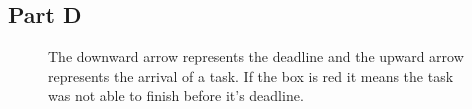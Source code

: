 \documentclass{article}
\begin{document}
	\subsection*{Part D}
	\begin{figure}[H]
		\begin{RTGrid}[width=16cm,height=8cm,nonumbers=1,labelsize=\Large]{3}{60}
			
			
			
			
			
			
			
			
			
			
			
			
			
			
			
			
		\end{RTGrid}
		\centering
		\caption{The downward arrow represents the deadline and the upward arrow represents the arrival of a task. If the box is red it means the task was not able to finish before it's deadline.}
	\end{figure}
\end{document}
